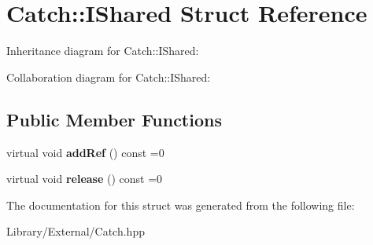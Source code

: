 \hypertarget{struct_catch_1_1_i_shared}{}\section{Catch\+:\+:I\+Shared Struct Reference}
\label{struct_catch_1_1_i_shared}


Inheritance diagram for Catch\+:\+:I\+Shared\+:


Collaboration diagram for Catch\+:\+:I\+Shared\+:
\subsection*{Public Member Functions}
\begin{DoxyCompactItemize}
\item 
\hypertarget{struct_catch_1_1_i_shared_ae383df68557cdaf0910b411af04d9e33}{}virtual void {\bfseries add\+Ref} () const =0\label{struct_catch_1_1_i_shared_ae383df68557cdaf0910b411af04d9e33}

\item 
\hypertarget{struct_catch_1_1_i_shared_a002f52624728a763956fb6f230cb2f57}{}virtual void {\bfseries release} () const =0\label{struct_catch_1_1_i_shared_a002f52624728a763956fb6f230cb2f57}

\end{DoxyCompactItemize}


The documentation for this struct was generated from the following file\+:\begin{DoxyCompactItemize}
\item 
Library/\+External/Catch.\+hpp\end{DoxyCompactItemize}
